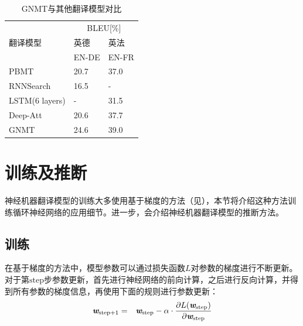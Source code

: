 \begin{table}[htp]
\centering
\caption{GNMT与其他翻译模型对比}
\label{tab:10-8}
\begin{tabular}{l l l}
\multicolumn{1}{l|}{\multirow{3}{*}{翻译模型}} & \multicolumn{2}{c}{BLEU[\%]} \\
\multicolumn{1}{l|}{}                    & 英德  & 英法                                               \\
\multicolumn{1}{l|}{}                    & EN-DE  & EN-FR                                               \\ \hline
\multicolumn{1}{l|}{PBMT}                & 20.7            & 37.0            \\
\multicolumn{1}{l|}{RNNSearch}           & 16.5            & -               \\
\multicolumn{1}{l|}{LSTM(6 layers)}      & -               & 31.5            \\
\multicolumn{1}{l|}{Deep-Att}            & 20.6            & 37.7            \\
\multicolumn{1}{l|}{GNMT}                & 24.6            & 39.0            \\
\end{tabular}
\end{table}

\sectionnewpage
\section{训练及推断}

神经机器翻译模型的训练大多使用基于梯度的方法（见{\chapternine}），本节将介绍这种方法训练循环神经网络的应用细节。进一步，会介绍神经机器翻译模型的推断方法。

\subsection{训练}

\parinterval 在基于梯度的方法中，模型参数可以通过损失函数$L$对参数的梯度进行不断更新。对于第$\textrm{step}$步参数更新，首先进行神经网络的前向计算，之后进行反向计算，并得到所有参数的梯度信息，再使用下面的规则进行参数更新：
\begin{eqnarray}
\textbf{\em w}_{\textrm{step}+1} &=& \textbf{\em w}_{\textrm{step}} - \alpha \cdot \frac{ \partial L(\textbf{\em w}_{\textrm{step}})} {\partial \textbf{\em w}_{\textrm{step}} }
\label{eq:10-24}
\end{eqnarray}

